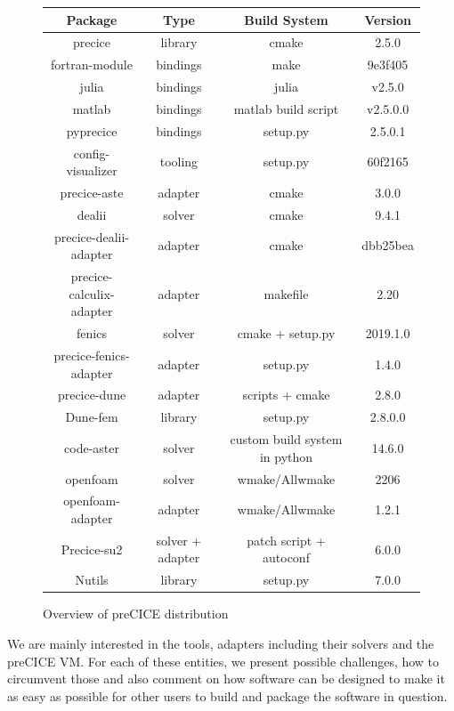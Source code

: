 \documentclass{eceasst}
\begin{document}
\begin{figure}[!t]
  \normalsize
  \caption{Overview of preCICE distribution}
  \label{table:label-distribution}
  \centering
  \begin{tabular}{|c|c|c|c|}
    \hline
    \bfseries Package & \bfseries Type & \bfseries Build System & \bfseries Version \\ \hline
    precice & library & cmake & 2.5.0 \\ \hline
    fortran-module & bindings & make & 9e3f405 \\ \hline
    julia & bindings & julia & v2.5.0 \\ \hline
    matlab & bindings & matlab build script & v2.5.0.0 \\ \hline
    pyprecice & bindings & setup.py & 2.5.0.1 \\ \hline
    config-visualizer & tooling & setup.py & 60f2165 \\ \hline
    precice-aste & adapter & cmake & 3.0.0 \\ \hline
    dealii & solver & cmake & 9.4.1 \\ \hline
    precice-dealii-adapter & adapter & cmake & dbb25bea \\ \hline
    precice-calculix-adapter & adapter & makefile & 2.20 \\ \hline
    fenics & solver & cmake + setup.py & 2019.1.0 \\ \hline
    precice-fenics-adapter & adapter & setup.py & 1.4.0 \\ \hline
    precice-dune & adapter & scripts + cmake & 2.8.0 \\ \hline
    Dune-fem & library & setup.py & 2.8.0.0 \\ \hline
    code-aster & solver & custom build system in python & 14.6.0 \\ \hline
    openfoam & solver & wmake/Allwmake & 2206 \\ \hline
    openfoam-adapter & adapter & wmake/Allwmake & 1.2.1 \\ \hline
    Precice-su2 & solver + adapter & patch script + autoconf & 6.0.0 \\ \hline
    Nutils & library & setup.py & 7.0.0 \\ \hline
  \end{tabular}
\end{figure}


We are mainly interested in the tools, adapters including their solvers and the preCICE VM.
For each of these entities, we present possible challenges, how to circumvent those and also comment on how software can be designed to make it as easy as possible for other users to build and package the software in question.
\end{document}
